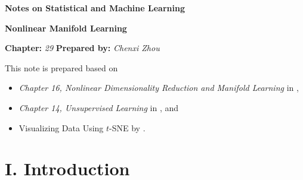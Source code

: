 \documentclass[12pt]{article}
\newcommand{\titlebox}[4]{
\begin{tcolorbox}[colback = blue!5!white!95, colframe = blue!70!black
]
  \noindent \textbf{ #1 } \hfill \textit{#2} 
  \begin{center}
  	 \LARGE{\textbf{#3}}
  \end{center}
\textbf{Chapter:} \textit{#4} \hfill \textbf{Prepared by:} \textit{Chenxi Zhou}
\end{tcolorbox}
}
\begin{document}
\titlebox{Notes on Statistical and Machine Learning}{}{Nonlinear Manifold Learning}{29}
\thispagestyle{plain}

\vspace{10pt}

This note is prepared based on 
\begin{itemize}
	\item \textit{Chapter 16, Nonlinear Dimensionality Reduction and Manifold Learning} in \textcite{Izenman2009-jk}, 
	\item \textit{Chapter 14, Unsupervised Learning} in \textcite{Friedman2001-np}, and 
	\item Visualizing Data Using $t$-SNE by \textcite{vanderMaaten2008-gh}. 
\end{itemize}


\section*{I. Introduction}
\end{document}
